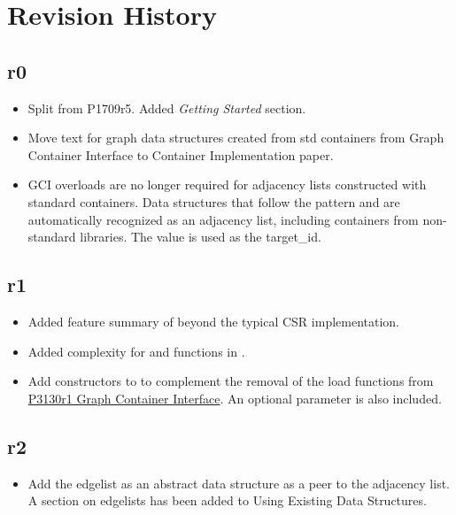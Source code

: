 \section{Revision History}

\subsection*{\paperno r0}

\begin{itemize}
      \item Split from P1709r5. Added \textit{Getting Started} section.
      \item Move text for graph data structures created from std containers from Graph Container Interface to 
            Container Implementation paper.
      \item GCI overloads are no longer required for adjacency lists constructed with standard containers. Data structures that follow
            the pattern  and 
            are automatically recognized as an adjacency list, including containers from non-standard libraries. The 
            value is used as the target\_id.
\end{itemize}

\subsection*{\paperno r1}
\begin{itemize}
      \item Added feature summary of  beyond the typical CSR implementation.
      \item Added complexity for  and  functions in .
      \item Add constructors to  to complement the removal of the load functions from 
            \href{https://www.wg21.link/P3130r1}{P3130r1 Graph Container Interface}. An optional  
            parameter is also included.
\end{itemize}

\subsection*{\paperno r2}

\begin{itemize}
      \item Add the edgelist as an abstract data structure as a peer to the adjacency list. 
            A section on edgelists has been added to Using Existing Data Structures.

\end{itemize}

